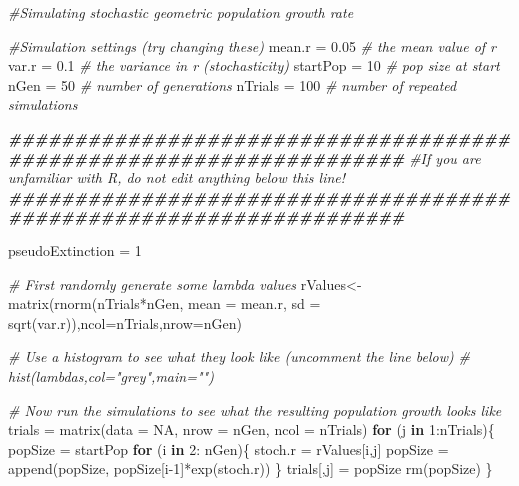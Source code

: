 \documentclass[
  a4paper]{book}
\newenvironment{Shaded}{\begin{snugshade}}{\end{snugshade}}
\newcommand{\AttributeTok}[1]{\textcolor[rgb]{0.77,0.63,0.00}{#1}}
\newcommand{\CommentTok}[1]{\textcolor[rgb]{0.56,0.35,0.01}{\textit{#1}}}
\newcommand{\ConstantTok}[1]{\textcolor[rgb]{0.00,0.00,0.00}{#1}}
\newcommand{\ControlFlowTok}[1]{\textcolor[rgb]{0.13,0.29,0.53}{\textbf{#1}}}
\newcommand{\DecValTok}[1]{\textcolor[rgb]{0.00,0.00,0.81}{#1}}
\newcommand{\DocumentationTok}[1]{\textcolor[rgb]{0.56,0.35,0.01}{\textbf{\textit{#1}}}}
\newcommand{\FloatTok}[1]{\textcolor[rgb]{0.00,0.00,0.81}{#1}}
\newcommand{\FunctionTok}[1]{\textcolor[rgb]{0.00,0.00,0.00}{#1}}
\newcommand{\NormalTok}[1]{#1}
\newcommand{\OtherTok}[1]{\textcolor[rgb]{0.56,0.35,0.01}{#1}}
\newcommand{\SpecialCharTok}[1]{\textcolor[rgb]{0.00,0.00,0.00}{#1}}
\begin{document}
\begin{Shaded}
\begin{Highlighting}[]
\CommentTok{\#Simulating stochastic geometric population growth rate}

\CommentTok{\#Simulation settings (try changing these)}
\NormalTok{mean.r }\OtherTok{=} \FloatTok{0.05} \CommentTok{\# the mean value of r}
\NormalTok{var.r }\OtherTok{=} \FloatTok{0.1} \CommentTok{\# the variance in r (stochasticity)}
\NormalTok{startPop }\OtherTok{=} \DecValTok{10} \CommentTok{\# pop size at start}
\NormalTok{nGen }\OtherTok{=} \DecValTok{50} \CommentTok{\# number of generations}
\NormalTok{nTrials }\OtherTok{=} \DecValTok{100} \CommentTok{\# number of repeated simulations}

\DocumentationTok{\#\#\#\#\#\#\#\#\#\#\#\#\#\#\#\#\#\#\#\#\#\#\#\#\#\#\#\#\#\#\#\#\#\#\#\#\#\#\#\#\#\#\#\#\#\#\#\#\#\#\#\#\#\#\#\#\#\#\#\#\#\#\#\#\#\#\#\#}
\CommentTok{\#If you are unfamiliar with R, do not edit anything below this line!}
\DocumentationTok{\#\#\#\#\#\#\#\#\#\#\#\#\#\#\#\#\#\#\#\#\#\#\#\#\#\#\#\#\#\#\#\#\#\#\#\#\#\#\#\#\#\#\#\#\#\#\#\#\#\#\#\#\#\#\#\#\#\#\#\#\#\#\#\#\#\#\#\#}

\NormalTok{pseudoExtinction }\OtherTok{=} \DecValTok{1}

\CommentTok{\# First randomly generate some lambda values}
\NormalTok{rValues}\OtherTok{\textless{}{-}}\FunctionTok{matrix}\NormalTok{(}\FunctionTok{rnorm}\NormalTok{(nTrials}\SpecialCharTok{*}\NormalTok{nGen, }\AttributeTok{mean =}\NormalTok{ mean.r, }\AttributeTok{sd =} \FunctionTok{sqrt}\NormalTok{(var.r)),}\AttributeTok{ncol=}\NormalTok{nTrials,}\AttributeTok{nrow=}\NormalTok{nGen)}

\CommentTok{\# Use a histogram to see what they look like (uncomment the line below)}
\CommentTok{\# hist(lambdas,col="grey",main="")}

\CommentTok{\# Now run the simulations to see what the resulting population growth looks like}
\NormalTok{trials }\OtherTok{=} \FunctionTok{matrix}\NormalTok{(}\AttributeTok{data =} \ConstantTok{NA}\NormalTok{, }\AttributeTok{nrow =}\NormalTok{ nGen, }\AttributeTok{ncol =}\NormalTok{ nTrials)}
\ControlFlowTok{for}\NormalTok{ (j }\ControlFlowTok{in} \DecValTok{1}\SpecialCharTok{:}\NormalTok{nTrials)\{}
\NormalTok{  popSize }\OtherTok{=}\NormalTok{ startPop  }
  \ControlFlowTok{for}\NormalTok{ (i }\ControlFlowTok{in} \DecValTok{2}\SpecialCharTok{:}\NormalTok{ nGen)\{}
\NormalTok{  stoch.r }\OtherTok{=}\NormalTok{ rValues[i,j]}
\NormalTok{  popSize }\OtherTok{=} \FunctionTok{append}\NormalTok{(popSize, popSize[i}\DecValTok{{-}1}\NormalTok{]}\SpecialCharTok{*}\FunctionTok{exp}\NormalTok{(stoch.r))}
\NormalTok{\}}
\NormalTok{trials[,j] }\OtherTok{=}\NormalTok{ popSize}
\FunctionTok{rm}\NormalTok{(popSize)}
\NormalTok{\}}


\end{Highlighting}
\end{Shaded}
\end{document}
